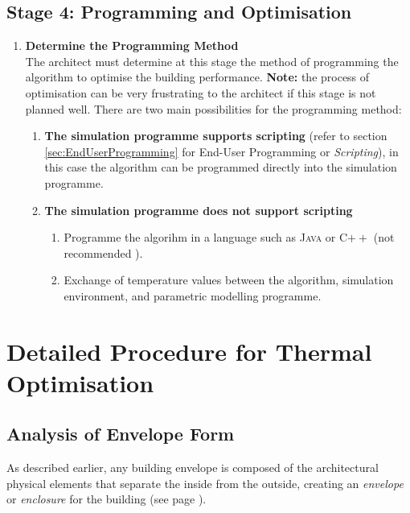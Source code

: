 \clearpage
\colorbox{95Gray}{%
	\begin{minipage}[c][20.5cm][t]{\textwidth}{%
		\subsection{Stage 4: Programming and Optimisation}
		\vspace{0.5cm}
		\begin{enumerate}
			\item \textbf{Determine the Programming Method}\\[3mm]
				The architect must determine at this stage the method of programming the algorithm to optimise the building performance. \textbf{Note:} the process of optimisation can be very frustrating to the architect if this stage is not planned well. There are two main possibilities for the programming method:
				\begin{enumerate}
					\item \textbf{The simulation programme supports scripting} (refer to section \ref{sec:EndUserProgramming} for End-User Programming or \emph{Scripting}), in this case the algorithm can be programmed directly into the simulation programme.
					\item \textbf{The simulation programme does not support scripting}
						\begin{enumerate}
							\item Programme the algorihm in a language such as \textsc{Java} or C$++$ (not recommended ).
							\item Exchange of temperature values between the algorithm, simulation environment, and parametric modelling programme.
						\end{enumerate}
				\end{enumerate}

		\end{enumerate}
	}%
\end{minipage}%
}

\section{Detailed Procedure for Thermal Optimisation}
\label{sec:DetailedProcedure}

\subsection{Analysis of Envelope Form}
\label{sec:AnalyseEnvelope}

As described earlier, any building envelope is composed of the architectural physical elements that separate the inside from the outside, creating an \emph{envelope} or \emph{enclosure} for the building (see page \pageref{BuildEnvDef}).

